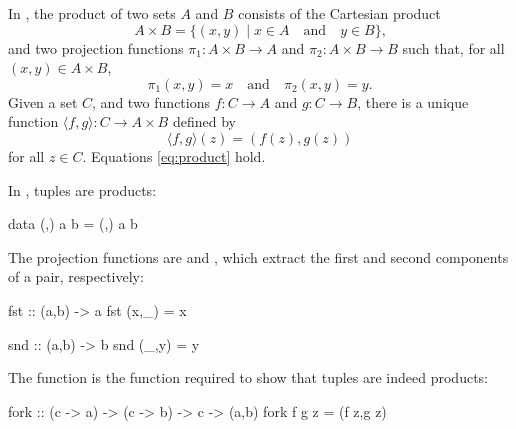 \begin{example}
  \label{ex:product-set}


  In \set, the product of two sets $A$ and $B$ consists of the
  Cartesian product
  \begin{equation}
    A \times B = \{(x,y) \mid x \in A \quad\text{and}\quad y \in B\}
    \text{,}
  \end{equation}
  and two projection functions $\pi_{1}: A \times B \to A$ and
  $\pi_{2}: A \times B \to B$ such that, for all $(x,y) \in A \times
  B$,
  \begin{equation*}
    \pi_{1}(x,y) = x
    \quad
    \text{and}
    \quad
    \pi_{2}(x,y) = y
    \text{.}
  \end{equation*}
  Given a set $C$, and two functions $f: C \to A$ and $g: C \to B$,
  there is a unique function $\langle{f,g}\rangle: C \to A \times B$
  defined by
  \begin{equation*}
    \langle{f,g}\rangle(z) = (f(z),g(z))
  \end{equation*}
  for all $z \in C$. Equations \eqref{eq:product} hold.

\end{example}

\begin{example}
  \label{ex:product-haskell}

  In \hask, tuples are products:
  \begin{codehaskell}
data (,) a b = (,) a b
  \end{codehaskell}
  The projection functions are  and
  , which extract the first and second components of
  a pair, respectively:
  \begin{codehaskell}
fst :: (a,b) -> a
fst (x,_) = x

snd :: (a,b) -> b
snd (_,y) = y
  \end{codehaskell}
  The  function is the function required to show
  that tuples are indeed products:
  \begin{codehaskell}
fork :: (c -> a) -> (c -> b) -> c -> (a,b)
fork f g z = (f z,g z)
  \end{codehaskell}

\end{example}


